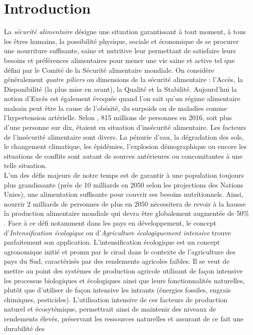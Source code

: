 \section{Introduction}

La \emph{sécurité alimentaire} désigne \og une situation garantissant à tout moment, à tous les êtres humains, la possibilité physique, sociale et économique 
de se procurer une nourriture suffisante, saine et nutritive leur permettant de satisfaire leurs besoins et préférences alimentaires pour mener une vie saine et active \fg{} tel que défini par le Comité de la Sécurité alimentaire mondiale. On considère généralement \emph {quatre piliers} ou dimensions de la sécurité alimentaire : l'Accès, la Disponibilité (la plus mise en avant), la Qualité et la Stabilité. Aujourd'hui la notion d'Excès est également évoquée quand l'on sait qu'un régime alimentaire malsain peut être la cause de l'obésité, du surpoids ou de maladies comme l'hypertension artérielle. Selon \citep{FAO2017}, 815 millions de personnes en 2016, soit plus d'une personne sur dix, étaient en situation d'insécurité alimentaire. Les facteurs de l'insécurité alimentaire sont divers. La pénurie d'eau, la dégradation des sols, le changement climatique, les épidémies, 
l'explosion démographique ou encore les situations de conflits sont autant de sources antérieures ou concomitantes à une telle situation. \\L'un des défis majeurs de notre temps est de garantir à une 
population toujours plus grandissante (près de 10 milliards en 2050 selon les projections des Nations Unies), une alimentation suffisante pour couvrir ses besoins nutritionnels. 
Ainsi, nourrir 2 milliards de personnes de plus en 2050 nécessitera de revoir à la hausse la production alimentaire mondiale qui devra être globalement augmentée de 50\% . Face à ce défi notamment dans les pays en développement, le concept \og d'\emph{Intensification écologique} ou d'\emph{Agriculture écologiquement intensive} \fg{} trouve 
parfaitement son application. L'intensification écologique est un concept agronomique initié et promu par le \acrshort{cirad} dans le contexte de l'agriculture des pays du Sud, caractérisés par des 
rendements agricoles faibles. Il se veut de mettre au point des systèmes de production agricole utilisant de façon intensive les processus biologiques et écologiques ainsi que leurs 
fonctionnalités naturelles, plutôt que d'utiliser de façon intensive les intrants (énergies fossiles, engrais chimiques, pesticides). L'utilisation intensive de ces facteurs de 
production naturel et écosytémique, permettrait ainsi de maintenir des niveaux de rendements élevés, préservant les ressources naturelles et assurant de ce fait une durabilité des
